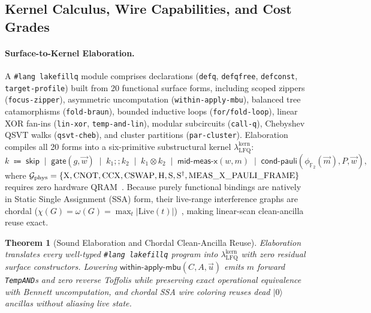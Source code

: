 \documentclass[acmsmall,screen,anonymous]{acmart}
\DeclareRobustCommand{\_}{\ifmmode\text{\char95}\else\char95\penalty0\relax\fi}
\theoremstyle{plain}
\newtheorem{theorem}{Theorem}[section]
\newcommand{\Gphys}{\ensuremath{\mathcal{G}_{\mathrm{phys}}}}
\begin{document}
\subsection{Kernel Calculus, Wire Capabilities, and Cost Grades}
\label{sec:unified_judgment}

\paragraph{Surface-to-Kernel Elaboration.}
A \texttt{\#lang lakefillq} module comprises declarations (\texttt{defq}, \texttt{defqfree}, \texttt{defconst}, \texttt{target-profile}) built from 20 functional surface forms, including scoped zippers (\texttt{focus-zipper}), asymmetric uncomputation (\texttt{within-apply-mbu}), balanced tree catamorphisms (\texttt{fold-braun}), bounded inductive loops (\texttt{for/fold-loop}), linear XOR fan-ins (\texttt{lin-xor}, \texttt{temp-and-lin}), modular subcircuits (\texttt{call-q}), Chebyshev QSVT walks (\texttt{qsvt-cheb}), and cluster partitions (\texttt{par-cluster}). Elaboration compiles all 20 forms into a six-primitive substructural kernel $\lambda_{\mathrm{LFQ}}^{\mathrm{kern}}$:
\[
  k \;\Coloneqq\; \mathsf{skip} \;\mid\; \mathsf{gate}(g, \vec{w}) \;\mid\; k_1 \mathbin{;;} k_2 \;\mid\; k_1 \otimes k_2 \;\mid\; \mathsf{mid\text{-}meas\text{-}x}(w, m) \;\mid\; \mathsf{cond\text{-}pauli}(\phi_{\mathbb{F}_2}(\vec{m}), P, \vec{w}),
\]
where $\Gphys = \{\mathrm{X}, \mathrm{CNOT}, \mathrm{CCX}, \mathrm{CSWAP}, \mathrm{H}, \mathrm{S}, \mathrm{S}^\dagger, \mathrm{MEAS\_X\_PAULI\_FRAME}\}$ requires zero hardware QRAM~\cite{bennett1989,gidney2018}. Because purely functional bindings are natively in Static Single Assignment (SSA) form, their live-range interference graphs are chordal ($\chi(G) = \omega(G) = \max_t |\mathrm{Live}(t)|$)~\cite{hack2006,poletto1999}, making linear-scan clean-ancilla reuse exact.

\begin{theorem}[Sound Elaboration and Chordal Clean-Ancilla Reuse]
\label{thm:t1}
Elaboration translates every well-typed \texttt{\#lang lakefillq} program into $\lambda_{\mathrm{LFQ}}^{\mathrm{kern}}$ with zero residual surface constructors. Lowering $\mathsf{within\text{-}apply\text{-}mbu}(C, A, \vec{u})$ emits $m$ forward \texttt{TempAND}s and zero reverse Toffolis while preserving exact operational equivalence with Bennett uncomputation, and chordal SSA wire coloring reuses dead $|0\rangle$ ancillas without aliasing live state.
\end{theorem}
\end{document}
